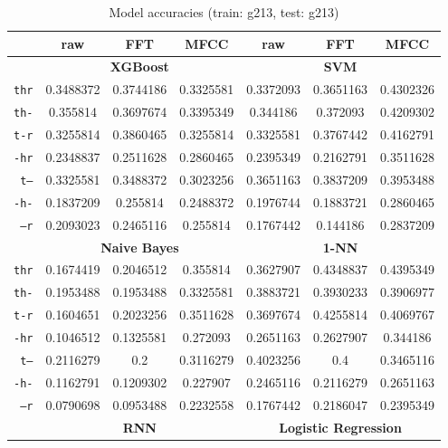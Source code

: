 \documentclass[../main.tex]{subfiles}
\begin{document}
\begin{table}[ht]
	\centering
	\caption{Model accuracies (train: g213, test: g213)}
	\vspace{-0.15cm}
	\label{tab:model_acc_g213_g213}
	\begin{small}
	\begin{tabular}{|r|c|c|c|c|c|c|}
		\hline
		 & \textbf{raw} & \textbf{FFT} & \textbf{MFCC} & \textbf{raw} & \textbf{FFT} & \textbf{MFCC} \\
		\hline
		 & \multicolumn{3}{|c|}{\textbf{XGBoost}} & \multicolumn{3}{|c|}{\textbf{SVM}} \\
		\hline
		\texttt{thr} & 0.3488372 & 0.3744186 & 0.3325581 & 0.3372093 & 0.3651163 & 0.4302326 \\
		\texttt{th-} & 0.355814 & 0.3697674 & 0.3395349 & 0.344186 & 0.372093 & 0.4209302 \\
		\texttt{t-r} & 0.3255814 & 0.3860465 & 0.3255814 & 0.3325581 & 0.3767442 & 0.4162791 \\
		\texttt{-hr} & 0.2348837 & 0.2511628 & 0.2860465 & 0.2395349 & 0.2162791 & 0.3511628 \\
		\texttt{t--} & 0.3325581 & 0.3488372 & 0.3023256 & 0.3651163 & 0.3837209 & 0.3953488 \\
		\texttt{-h-} & 0.1837209 & 0.255814 & 0.2488372 & 0.1976744 & 0.1883721 & 0.2860465 \\
		\texttt{--r} & 0.2093023 & 0.2465116 & 0.255814 & 0.1767442 & 0.144186 & 0.2837209 \\
		\hline
		 & \multicolumn{3}{|c|}{\textbf{Naive Bayes}} & \multicolumn{3}{|c|}{\textbf{1-NN}} \\
		\hline
		\texttt{thr} & 0.1674419 & 0.2046512 & 0.355814 & 0.3627907 & 0.4348837 & 0.4395349 \\
		\texttt{th-} & 0.1953488 & 0.1953488 & 0.3325581 & 0.3883721 & 0.3930233 & 0.3906977 \\
		\texttt{t-r} & 0.1604651 & 0.2023256 & 0.3511628 & 0.3697674 & 0.4255814 & 0.4069767 \\
		\texttt{-hr} & 0.1046512 & 0.1325581 & 0.272093 & 0.2651163 & 0.2627907 & 0.344186 \\
		\texttt{t--} & 0.2116279 & 0.2 & 0.3116279 & 0.4023256 & 0.4 & 0.3465116 \\
		\texttt{-h-} & 0.1162791 & 0.1209302 & 0.227907 & 0.2465116 & 0.2116279 & 0.2651163 \\
		\texttt{--r} & 0.0790698 & 0.0953488 & 0.2232558 & 0.1767442 & 0.2186047 & 0.2395349 \\
		\hline
		 & \multicolumn{3}{|c|}{\textbf{RNN}} & \multicolumn{3}{|c|}{\textbf{Logistic Regression}} \\

\end{tabular}
\end{small}
\end{table}
\end{document}
